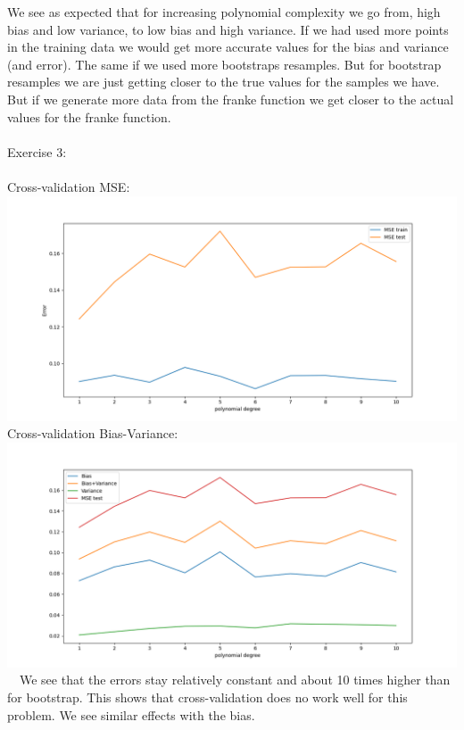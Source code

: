 \documentclass[12pt, letterpaper, twoside]{article}
\begin{document}
We see as expected that for increasing polynomial complexity we go from, high bias and low variance, to low bias and high variance. If we had used more points in the training data we would get more accurate values for the bias and variance (and error). The same if we used more bootstraps resamples. But for bootstrap resamples we are just getting closer to the true values for the samples we have. But if we generate more data from the franke function we get closer to the actual values for the franke function.\\
\newpage
\ \\
Exercise 3:\\
\ \\
Cross-validation MSE:\\
\includegraphics[scale=0.5]{"ex3_errors.png"}\\
Cross-validation Bias-Variance:\\
\includegraphics[scale=0.5]{"ex3_bias_variance.png"}\\
\ \
We see that the errors stay relatively constant and about 10 times higher than for bootstrap. This shows that cross-validation does no work well for this problem. We see similar effects with the bias.\\
\ \\
\end{document}
